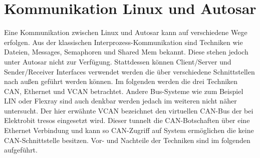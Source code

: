 \documentclass[
  a4paper,					    %
  twoside,
  DIV=calc,     				%
  bibliography=totoc,
  cleardoublepage=empty,
  ngerman,     					%
  final       					%
]{scrbook}
\begin{document}



\section{Kommunikation Linux und Autosar}
\label{sec:Kommunikation_L_A}
Eine Kommunikation zwischen Linux und Autosar kann auf verschiedene Wege erfolgen. Aus der klassischen Interprozess-Kommunikation sind Techniken wie Dateien, Messages, Semaphoren und Shared Mem bekannt. Diese stehen jedoch unter Autosar nicht zur Verfügung. Stattdessen können Client/Server und Sender/Receiver Interfaces verwendet werden die über verschiedene Schnittstellen nach außen geführt werden können. Im folgenden werden die drei Techniken CAN, Ethernet und VCAN betrachtet. Andere Bus-Systeme wie zum Beispiel LIN oder Flexray sind auch denkbar werden jedach im weiteren nicht näher untersucht. Der hier erwähnte VCAN bezeichnet den virtuellen CAN-Bus der bei Elektrobit tresos eingesetzt wird. Dieser tunnelt die CAN-Botschaften über eine Ethernet Verbindung und kann so CAN-Zugriff auf System ermöglichen die keine CAN-Schnittstelle besitzen. Vor- und Nachteile der Techniken sind im folgenden aufgeführt.
\end{document}

